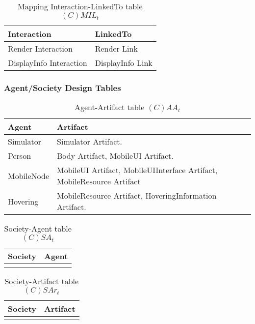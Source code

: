 \begin{table}[H]
	\centering
	\begin{tabular}{|p{4cm}|p{8cm}|}
			\hline
			\textbf{Interaction} & \textbf{LinkedTo} \\
			\hline
			Render Interaction & Render Link \\
			\hline
			DisplayInfo Interaction & DisplayInfo Link \\
			\hline
		\end{tabular}
	\caption{Mapping Interaction-LinkedTo table $(C)MIL_t$}
	\label{tab:cmilt}
\end{table}

\subsubsection{Agent/Society Design Tables}

\begin{table}[H]
	\centering
	\begin{tabular}{|p{4cm}|p{8cm}|}
			\hline
			\textbf{Agent} & \textbf{Artifact} \\
			\hline
			Simulator & Simulator Artifact. \\
			\hline
			Person & Body Artifact, MobileUI Artifact. \\
			\hline
      MobileNode & MobileUI Artifact, MobileUIInterface Artifact, MobileResource
      Artifact\\
			\hline
			Hovering & MobileResource Artifact, HoveringInformation Artifact. \\
			\hline
		\end{tabular}
	\caption{Agent-Artifact table $(C)AA_t$}
	\label{tab:caat}
\end{table}

\begin{table}[H]
	\centering
	\begin{tabular}{|p{4cm}|p{8cm}|}
			\hline
			\textbf{Society} & \textbf{Agent} \\
			\hline
			& \\
			\hline
		\end{tabular}
	\caption{Society-Agent table $(C)SA_t$}
	\label{tab:csat}
\end{table}

\begin{table}[H]
	\centering
	\begin{tabular}{|p{4cm}|p{8cm}|}
			\hline
			\textbf{Society} & \textbf{Artifact} \\
			\hline
			& \\
			\hline
		\end{tabular}
	\caption{Society-Artifact table $(C)SAr_t$}
	\label{tab:csart}
\end{table}

